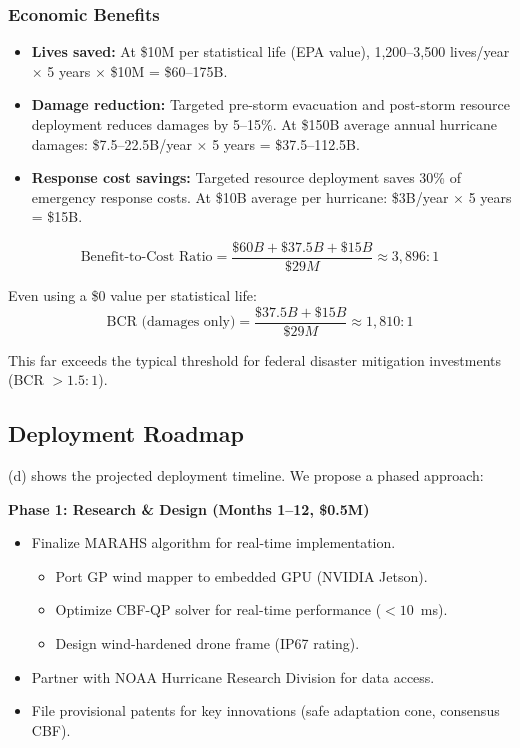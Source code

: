 \documentclass[12pt,a4paper,twocolumn]{article}
\begin{document}
\begin{enumerate}[leftmargin=*]
\subsubsection{Economic Benefits}
\begin{itemize}[leftmargin=*]
    \item \textbf{Lives saved:} At \$10M per statistical life (EPA value), 1,200--3,500 lives/year $\times$ 5 years $\times$ \$10M = \$60--175B.
    \item \textbf{Damage reduction:} Targeted pre-storm evacuation and post-storm resource deployment reduces damages by 5--15\%. At \$150B average annual hurricane damages: \$7.5--22.5B/year $\times$ 5 years = \$37.5--112.5B.
    \item \textbf{Response cost savings:} Targeted resource deployment saves 30\% of emergency response costs. At \$10B average per hurricane: \$3B/year $\times$ 5 years = \$15B.
\end{itemize}

\begin{equation}
    \text{Benefit-to-Cost Ratio} = \frac{\$60B + \$37.5B + \$15B}{\$29M} \approx 3,896:1
\end{equation}

Even using a \$0 value per statistical life:
\begin{equation}
    \text{BCR (damages only)} = \frac{\$37.5B + \$15B}{\$29M} \approx 1,810:1
\end{equation}

This far exceeds the typical threshold for federal disaster mitigation investments (BCR $> 1.5:1$).

\subsection{Deployment Roadmap}
\label{sec:deployment}

(d) shows the projected deployment timeline. We propose a phased approach:

\textbf{Phase 1: Research \& Design (Months 1--12, \$0.5M)}
\begin{itemize}[leftmargin=*]
    \item Finalize MARAHS algorithm for real-time implementation.
    \begin{itemize}
        \item Port GP wind mapper to embedded GPU (NVIDIA Jetson).
        \item Optimize CBF-QP solver for real-time performance ($<10$~ms).
        \item Design wind-hardened drone frame (IP67 rating).
    \end{itemize}
    \item Partner with NOAA Hurricane Research Division for data access.
    \item File provisional patents for key innovations (safe adaptation cone, consensus CBF).
\end{itemize}


\end{enumerate}
\end{document}
